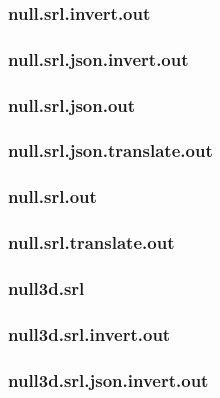 \subsubsection{null.srl.invert.out}
\label{app:null_srl.invert.out}

\subsubsection{null.srl.json.invert.out}
\label{app:null_srl.json.invert.out}

\subsubsection{null.srl.json.out}
\label{app:null_srl.json.out}

\subsubsection{null.srl.json.translate.out}
\label{app:null_srl.json.translate.out}

\subsubsection{null.srl.out}
\label{app:null_srl.out}

\subsubsection{null.srl.translate.out}
\label{app:null_srl.translate.out}

\subsubsection{null3d.srl}
\label{app:null3d_srl}

\subsubsection{null3d.srl.invert.out}
\label{app:null3d_srl.invert.out}

\subsubsection{null3d.srl.json.invert.out}
\label{app:null3d_srl.json.invert.out}

